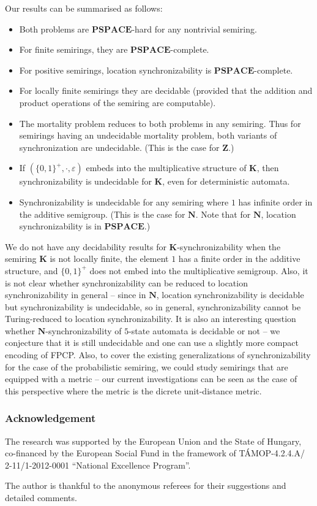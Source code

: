 \documentclass[submission,copyright,creativecommons]{eptcs}
\def\bK{{\mathbf{K}}}
\def\bN{{\mathbf{N}}}
\def\bZ{{\mathbf{Z}}}
\theoremstyle{plain}
\theoremstyle{definition}
\theoremstyle{remark}
\begin{document}
Our results can be summarised as follows:
\begin{itemize}
\item Both problems are $\mathbf{PSPACE}$-hard for any nontrivial semiring.
\item For finite semirings, they are $\mathbf{PSPACE}$-complete.
\item For positive semirings, location synchronizability is $\mathbf{PSPACE}$-complete.
\item For locally finite semirings they are decidable (provided that the addition and product operations of the semiring are computable).
\item The mortality problem reduces to both problems in any semiring. Thus for semirings having an undecidable mortality problem,
  both variants of synchronization are undecidable. (This is the case for $\bZ$.)
\item If $(\{0,1\}^+,\cdot,\varepsilon)$ embeds into the multiplicative structure of $\bK$, then synchronizability is undecidable
  for $\bK$, even for deterministic automata.
\item Synchronizability is undecidable for any semiring where $1$ has infinite order in the additive semigroup. (This is the case for $\bN$.
  Note that for $\bN$, location synchronizability is in $\mathbf{PSPACE}$.)
\end{itemize}
We do not have any decidability results for $\bK$-synchronizability when the semiring $\bK$ is not locally finite, the element $1$ has a finite
order in the additive structure, and $\{0,1\}^+$ does not embed into the multiplicative semigroup. Also, it is not clear whether synchronizability
can be reduced to location synchronizability in general -- since in $\bN$, location synchronizability is decidable but synchronizability is
undecidable, so in general, synchronizability cannot be Turing-reduced to location synchronizability. It is also an interesting question whether
$\bN$-synchronizability of $5$-state automata is decidable or not -- we conjecture that it is still undecidable and one can use a slightly more compact
encoding of FPCP. Also, to cover the existing generalizations of synchronizability for the case of the probabilistic semiring,
we could study semirings that are equipped with a metric -- our current investigations can be seen as the case of this perspective
where the metric is the dicrete unit-distance metric.

\subsubsection*{Acknowledgement}
The research was supported by the European Union and the State of Hungary,
co-financed by the European Social Fund in the framework of T\'AMOP-4.2.4.A/ 2-11/1-2012-0001 ``National Excellence Program''.

The author is thankful to the anonymous referees for their suggestions and detailed comments.



\end{document}
